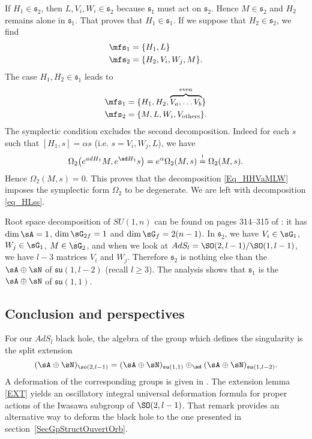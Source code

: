 If $H_1\in\mathfrak{s}_2$, then $L,V_i,W_i\in\mathfrak{s}_2$ because $\mathfrak{s}_1$ must act on $\mathfrak{s}_2$. Hence $M\in\mathfrak{s}_2$ and $H_2$ remains alone in $\mathfrak{s}_1$. That proves that $H_1\in\mathfrak{s}_1$. If we suppose that $H_2\in\mathfrak{s}_2$, we find
\begin{equation}  \label{eq_HLss}
 \begin{split}
  \mfs_1&=\{ H_1,L  \}\\
\mfs_2&=\{ H_2,V_i,W_j,M  \}.
\end{split}
\end{equation}
The case $H_1,H_2\in\mathfrak{s}_1$ leads to
\begin{equation}   \label{Eq_HHVaMLW}
 \begin{split}
	\mfs_1&=\{ H_1,H_2,\overbrace{V_a,\ldots V_b}^{\text{even}}  \}\\
	\mfs_2&=\{ M,L,W_i,V_{\text{others}}  \}.
\end{split}
\end{equation}
The symplectic condition excludes the second decomposition. Indeed for each $s$ such that $[H_1,s]=\alpha s$ (i.e. $s=V_i,W_j,L$), we have
\[
  \Omega_2\big(  e^{ad H_1}M, e^{\ad H_1}s \big)= e^{\alpha}\Omega_2(M,s)\stackrel{!}{=}\Omega_2(M,s).
\]
Hence $\Omega_2(M,s)=0$. This proves that the decomposition \eqref{Eq_HHVaMLW} imposes the symplectic form $\Omega_2$ to be degenerate. We are left with decomposition \eqref{eq_HLss}.

Root space decomposition of $SU(1,n)$ can be found on pages 314--315 of \cite{Knapp}: it has $\dim\sA=1$, $\dim\sG_{2f}=1$ and $\dim\sG_f=2(n-1)$. In $\mathfrak{s}_2$, we have $V_i\in\sG_1$, $W_j\in\sG_1$, $M\in\sG_2$, and when we look at $AdS_l=\SO(2,l-1)/\SO(1,l-1)$, we have $l-3$ matrices $V_i$ and $W_j$. Therefore $\mathfrak{s}_2$ is nothing else than the $\sA\oplus\sN$ of $\mathfrak{su}(1,l-2)$ (recall $l\geq3$). The analysis shows that $\mathfrak{s}_1$ is the $\sA\oplus\sN$ of $\mathfrak{su}(1,1)$.

\subsection{Conclusion and perspectives}

For our $AdS_l$ black hole, the algebra of the group which defines the singularity is the split extension
\[
  (\sA\oplus\sN)_{\so(2,l-1)}=(\sA\oplus\sN)_{\mathfrak{su}(1,1)}\oplus_{\ad}(\sA\oplus\sN)_{\mathfrak{su}(1,l-2)}.
\]
A deformation of the corresponding groups is given in \cite{Biel-Massar}. The extension lemma \ref{EXT} yields an oscillatory integral universal deformation formula for proper actions of the Iwasawa subgroup of $\SO(2,l-1)$. That remark provides an alternative way to deform the black hole to the one presented in section~\ref{SecGpStructOuvertOrb}.

